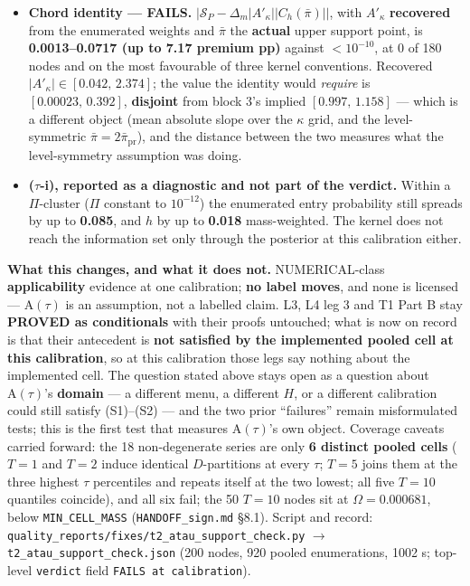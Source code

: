 \documentclass[11pt,a4paper]{article}
\newcommand{\Atau}{\mathrm{A}(\tau)}
\newcommand{\Akap}{A'_{\kappa}}
\begin{document}
\begin{description}[leftmargin=1.9em,style=unboxed]
\begin{itemize}
    recorded as \textbf{inherited} --- a restatement of the support failure, not a second
    piece of evidence.
  \item \textbf{Chord identity --- FAILS.}
    $\lvert\mathcal S_P-\Delta_m\lvert\Akap\rvert\lvert C_h(\bar\pi)\rvert\rvert$, with
    $\Akap$ \textbf{recovered} from the enumerated weights and $\bar\pi$ the
    \textbf{actual} upper support point, is \textbf{0.0013--0.0717 (up to 7.17 premium
    pp)} against $<10^{-10}$, at 0 of 180 nodes and on the most favourable of three
    kernel conventions. Recovered $\lvert\Akap\rvert\in[0.042,\,2.374]$; the value the
    identity would \emph{require} is $[0.00023,\,0.392]$, \textbf{disjoint} from block
    3's implied $[0.997,\,1.158]$ --- which is a different object (mean absolute slope
    over the $\kappa$ grid, and the level-symmetric
    $\bar\pi=2\bar\pi_{\mathrm{pr}}$), and the distance between the two measures what the
    level-symmetry assumption was doing.
  \item \textbf{($\tau$-i), reported as a diagnostic and not part of the verdict.} Within
    a $\Pi$-cluster ($\Pi$ constant to $10^{-12}$) the enumerated entry probability still
    spreads by up to \textbf{0.085}, and $h$ by up to \textbf{0.018} mass-weighted. The
    kernel does not reach the information set only through the posterior at this
    calibration either.
  \end{itemize}

  \textbf{What this changes, and what it does not.} NUMERICAL-class
  \textbf{applicability} evidence at one calibration; \textbf{no label moves}, and none
  is licensed --- $\Atau$ is an assumption, not a labelled claim. L3, L4 leg 3 and T1
  Part B stay \textbf{PROVED as conditionals} with their proofs untouched; what is now on
  record is that their antecedent is \textbf{not satisfied by the implemented pooled cell
  at this calibration}, so at this calibration those legs say nothing about the
  implemented cell. The question stated above stays open as a question about $\Atau$'s
  \textbf{domain} --- a different menu, a different $H$, or a different calibration could
  still satisfy (S1)--(S2) --- and the two prior ``failures'' remain misformulated tests;
  this is the first test that measures $\Atau$'s own object. Coverage caveats carried
  forward: the 18 non-degenerate series are only \textbf{6 distinct pooled cells} ($T=1$
  and $T=2$ induce identical $D$-partitions at every $\tau$; $T=5$ joins them at the three
  highest $\tau$ percentiles and repeats itself at the two lowest; all five $T=10$
  quantiles coincide), and all six fail; the 50 $T=10$ nodes sit at $\Omega=0.000681$,
  below \texttt{MIN\_CELL\_MASS} (\texttt{HANDOFF\_sign.md} \S8.1). Script and record:
  \texttt{quality\_reports/\allowbreak fixes/\allowbreak t2\_atau\_support\_check.py}
  $\to$ \texttt{t2\_atau\_support\_check.json} (200 nodes, 920 pooled enumerations,
  1002 s;
  top-level \texttt{verdict} field \texttt{FAILS at calibration}).


\end{description}
\end{document}
